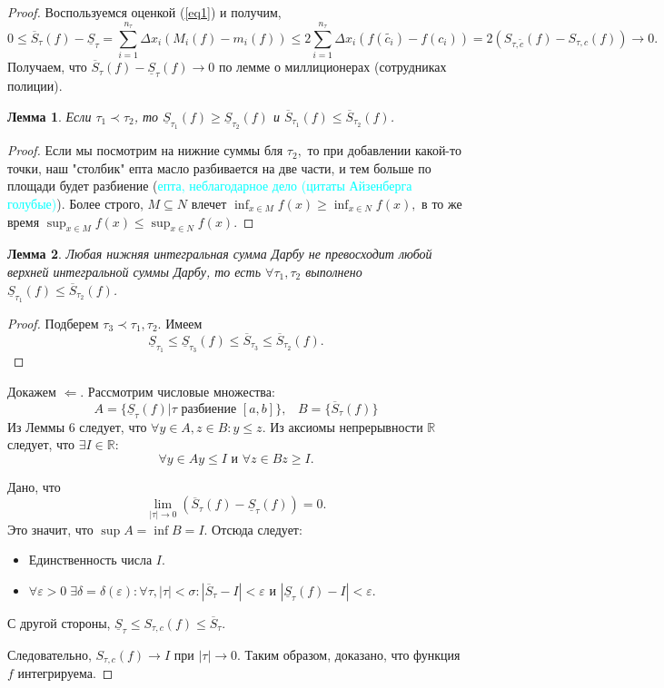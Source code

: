 \documentclass{article}
\theoremstyle{plain}
\newtheorem{lemma}{Лемма}
\theoremstyle{definition}
\theoremstyle{remark}
\begin{document}
\begin{proof}
Воспользуемся оценкой (\ref{eq1}) и получим, 
$$0\leq \overline{S}_{\tau}(f) - \underline{S}_{\tau} = \sum_{i=1}^{n_{\tau}} \Delta x_i(M_i(f) - m_i(f)) \leq 2 \sum_{i=1}^{n_{\tau}} \Delta x_i(f(\widetilde{c_i}) - f(c_i)) = 2(S_{\tau, \widetilde{c}}(f) - S_{\tau, c}(f)) \to 0.$$
Получаем, что $\overline{S}_{\tau}(f) - \underline{S}_{\tau}(f) \to 0$ по лемме о миллиционерах (сотрудниках полиции).\\



\begin{lemma}
Если  $\tau_1 \prec \tau_2$, то $\underline{S}_{\tau_1}(f) \geq \underline{S}_{\tau_2}(f)$ и $\overline{S}_{\tau_1}(f) \leq \overline{S}_{\tau_2}(f)$.
\end{lemma}
\begin{proof}
Если мы посмотрим на нижние суммы  бля $\tau_2,$ то при добавлении какой-то точки, наш "столбик" епта масло разбивается на две части, и тем больше по площади будет разбиение (\textcolor{cyan}{епта, неблагодарное дело (цитаты Айзенберга голубые)}). Более строго, $M\subseteq N$ влечет $\inf_{x \in M}f(x) \geq \inf_{x \in N}f(x),$ в то же время $\sup_{x \in M}f(x) \leq \sup_{x \in N}f(x).$
\end{proof}
\begin{lemma}
Любая нижняя интегральная сумма Дарбу не превосходит любой верхней интегральной суммы Дарбу, то есть $\forall \tau_1, \tau_2$  выполнено $\underline{S}_{\tau_1}(f) \leq \overline{S}_{\tau_2}(f)$.
\end{lemma}
\begin{proof}
Подберем $\tau_3 \prec \tau_1, \tau_2.$ Имеем 
\[
\underline{S}_{\tau_1} \leq \underline{S}_{\tau_3}(f) \leq \overline{S}_{\tau_3} \leq \overline{S}_{\tau_2}(f).
\]
\end{proof}


Докажем $\Leftarrow$. 
Рассмотрим числовые множества:
$$A = \{\underline{S}_{\tau}(f) | \tau \text{ разбиение } [a, b]\},\;\;\;B = \{\overline{S}_{\tau}(f)\}$$
Из Леммы 6 следует, что $\forall y \in A, z \in B : y \leq z.$ Из аксиомы непрерывности $\mathbb{R}$ следует, что $\exists I\in \mathbb{R}$:
$$\forall y\in A y\leq I \text{ и } \forall z\in B z\geq I.$$

Дано, что $$\lim_{|\tau| \to 0} (\overline{S}_{\tau}(f) - \underline{S}_{\tau}(f)) = 0.$$ Это значит, что $\sup A = \inf B = I$. Отсюда следует:
\begin{itemize}
    \item Единственность числа $I.$
    \item $\forall \varepsilon > 0\; \exists \delta = \delta(\varepsilon): \forall \tau, |\tau| < \sigma: |\overline{S}_{\tau} - I| < \varepsilon$ и $|\underline{S}_{\tau}(f) - I| < \varepsilon$.
\end{itemize}

С другой стороны, $\underline{S}_{\tau} \leq S_{\tau, c}(f) \leq \overline{S}_{\tau}$.

Следовательно, $S_{\tau, c}(f) \to I$ при $|\tau| \to 0.$ Таким образом, доказано, что функция $f$ интегрируема.
\end{proof}
\end{document}
